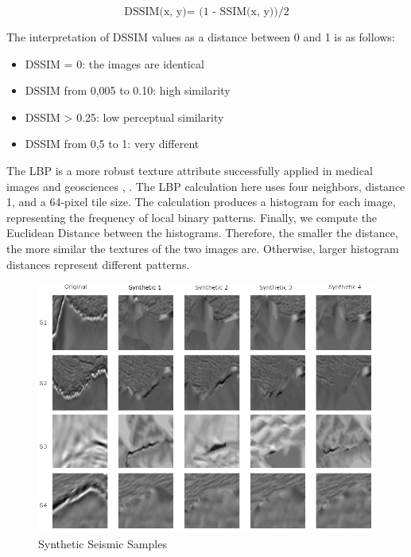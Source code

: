 \documentclass{ieeeaccess}
\begin{document}
\begin{equation}
\label{eq:mse2}
\text {DSSIM(x, y)= (1 - SSIM(x, y))/2}
\end{equation}

The interpretation of DSSIM values as a distance between 0 and 1 is as follows: 

\begin{itemize}
    \item DSSIM = 0: the images are identical
    \item DSSIM from 0,005 to 0.10: high similarity
    \item DSSIM > 0.25: low perceptual similarity
    \item DSSIM from 0,5 to 1: very different
\end{itemize}

The LBP is a more robust texture attribute successfully applied in medical images and geosciences \cite{vatamanu_content-based_2013}, \cite{britto_mattos_assessing_2017}. The LBP calculation here uses four neighbors, distance 1, and a 64-pixel tile size. The calculation produces a histogram for each image, representing the frequency of local binary patterns. Finally, we compute the Euclidean Distance between the histograms. Therefore, the smaller the distance, the more similar the textures of the two images are. Otherwise, larger histogram distances represent different patterns.

\begin{figure}
    \centering
    \includegraphics[width=1\textwidth]{images/imagens.png}
    \caption{Synthetic Seismic Samples}
    \label{fig:placeholder}
\end{figure}
\end{document}
